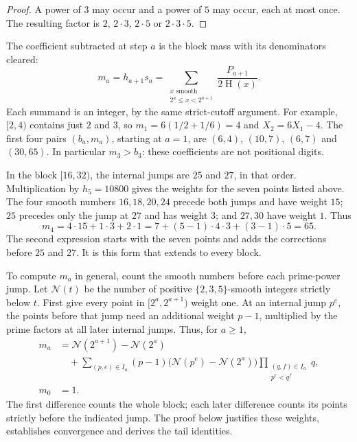 \documentclass[11pt]{article}
\theoremstyle{remark}
\theoremstyle{plain}
\newcommand{\hgt}{\operatorname{H}}
\begin{document}
\begin{proof}
A power of $3$ may occur and a power of $5$ may occur, each at most once.
The resulting factor is $2$, $2\cdot3$, $2\cdot5$ or $2\cdot3\cdot5$.
\end{proof}


The coefficient subtracted at step $a$ is the block mass with its
denominators cleared:
\[
 m_a=h_{a+1}s_a
 =\sum_{\substack{x\text{ smooth}\\2^a\le x<2^{a+1}}}
       \frac{P_{a+1}}{2\hgt(x)}.
\]
Each summand is an integer, by the same strict-cutoff argument.
For example, $[2,4)$ contains just $2$ and $3$, so
$m_1=6(1/2+1/6)=4$ and $X_2=6X_1-4$.
The first four pairs $(b_a,m_a)$, starting at $a=1$, are
$(6,4)$, $(10,7)$, $(6,7)$ and $(30,65)$.
In particular $m_3>b_3$: these coefficients are not positional digits.

In the block $[16,32)$, the internal jumps are $25$ and $27$, in that
order. Multiplication by $h_5=10800$ gives the weights for the seven
points listed above.  The four smooth numbers
$16,18,20,24$ precede both jumps and have weight $15$; $25$ precedes only
the jump at $27$ and has weight $3$; and $27,30$ have weight $1$.  Thus
\[
 m_4=4\cdot15+1\cdot3+2\cdot1
     =7+(5-1)\cdot4\cdot3+(3-1)\cdot5=65.
\]
The second expression starts with the seven points and adds the
corrections before $25$ and $27$.  It is this form that extends to every
block.

To compute $m_a$ in general, count the smooth numbers before each
prime-power jump.
Let $\mathcal N(t)$ be the number of positive $\{2,3,5\}$-smooth integers
strictly below $t$.  First give every point in $[2^a,2^{a+1})$ weight one.
At an internal jump $p^e$, the points before that jump need an additional
weight $p-1$, multiplied by the prime factors at all later internal jumps.
Thus, for $a\ge1$,
\begin{equation}\label{long269:eq:actual-digit}
\begin{aligned}
 m_a&=\mathcal N(2^{a+1})-\mathcal N(2^a)\\
 &\quad+\sum_{(p,e)\in I_a}(p-1)
       \bigl(\mathcal N(p^e)-\mathcal N(2^a)\bigr)
       \prod_{\substack{(q,f)\in I_a\\p^e<q^f}}q,\\
 m_0&=1.
\end{aligned}
\end{equation}
The first difference counts the whole block; each later difference counts
its points strictly before the indicated jump.  The proof below justifies
these weights, establishes convergence and derives the tail identities.
\end{document}
